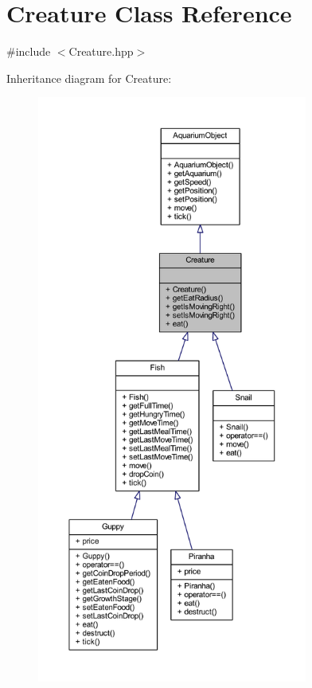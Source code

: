 \hypertarget{class_creature}{}\section{Creature Class Reference}
\label{class_creature}


{\ttfamily \#include $<$Creature.\+hpp$>$}



Inheritance diagram for Creature\+:
\nopagebreak
\begin{figure}[H]
\begin{center}
\leavevmode
\includegraphics[height=550pt]{class_creature__inherit__graph}
\end{center}
\end{figure}



